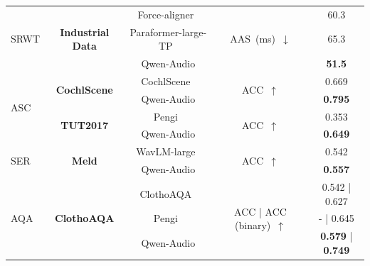 \documentclass{article}
\begin{document}
\begin{table}[t!]
{\begin{tabular}{lcccc}
\multirow{3}{*}{SRWT}   & \multirow{3}{*}{\textbf{Industrial Data} }        & Force-aligner~\citep{forcealigner}               & \multirow{3}{*}{AAS~(ms)~$\downarrow$} & 60.3 \\
     &           & Paraformer-large-TP~\citep{FunASR}                   &                                         & 65.3  \\
      &                    & Qwen-Audio                   &                                         & \textbf{51.5}  \\\midrule
\multirow{4}{*}{ASC}    & \multirow{2}{*}{\textbf{CochlScene}}     & CochlScene~\citep{cochlscene}    & \multirow{2}{*}{ACC~$\uparrow$}                    & 0.669                 \\
                                                  &                                 & Qwen-Audio                   &                                         & \textbf{0.795}                 \\ \cmidrule(l){2-5} 
                                                  & \multirow{2}{*}{\textbf{TUT2017} }       & Pengi~\citep{Pengi}                  & \multirow{2}{*}{ACC~$\uparrow$}                    & 0.353                 \\
                                                  &                                 & Qwen-Audio                   &                                         & \textbf{0.649}                 \\ \midrule
\multirow{2}{*}{SER} & \multirow{2}{*}{\textbf{Meld}}           & WavLM-large~\citep{wavlm}            & \multirow{2}{*}{ACC~$\uparrow$}                    & 0.542                 \\
                                                  &                                 & Qwen-Audio                    &                                         & \textbf{0.557}                 \\ \midrule
\multirow{3}{*}{AQA}   & \multirow{3}{*}{\textbf{ClothoAQA}}      & ClothoAQA~\citep{ClothoAQA}     & \multirow{3}{*}{ACC | ACC (binary)~$\uparrow$}     & 0.542 | 0.627         \\
                                                  &                                 & Pengi~\citep{Pengi}                  &                                         & - | 0.645             \\
                                                  &                                 & Qwen-Audio                    &                                         & \textbf{0.579} | \textbf{0.749}         \\ \midrule

\end{tabular}}
\end{table}
\end{document}
